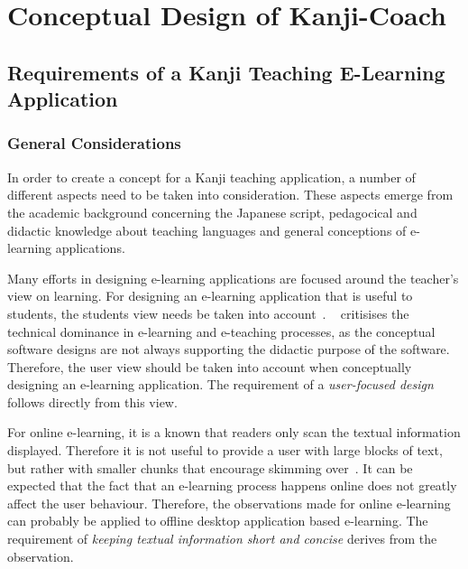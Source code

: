 
\chapter{Conceptual Design of Kanji-Coach}
\label{chap:conceptualdesignofkanjicoach}

\section{Requirements of a Kanji Teaching E-Learning Application}
\label{sec:concept:requirements}

\subsection{General Considerations}
\label{sec:concept:generalconsiderations}

In order to create a concept for a Kanji teaching application,
a number of different aspects need to be taken into consideration.
These aspects emerge from the academic background concerning the Japanese script,
pedagocical and didactic knowledge about teaching languages and general
conceptions of e-learning applications.

Many efforts in designing e-learning applications are focused around the
teacher's view on learning. For designing an e-learning application that
is useful to students, the students view needs be taken into 
account~. 
~\citeyear{Ivashin2009} critisises the technical 
dominance in e-learning and e-teaching processes, as the conceptual software
designs are not always supporting the didactic purpose of the software.
Therefore, the user view should be taken into account when conceptually designing
an e-learning application.
The requirement of a \emph{user-focused design} follows directly from this view.

For online e-learning, it is a known that readers only scan the textual 
information displayed. Therefore it is not useful to provide a user with 
large blocks of text, but rather with smaller chunks that encourage 
skimming over~. It can be expected that the fact
that an e-learning process happens online does not greatly affect the user 
behaviour. Therefore, the observations made for online e-learning can
probably be applied to offline desktop application based e-learning.
The requirement of \emph{keeping textual information short and concise} derives
from the observation.

